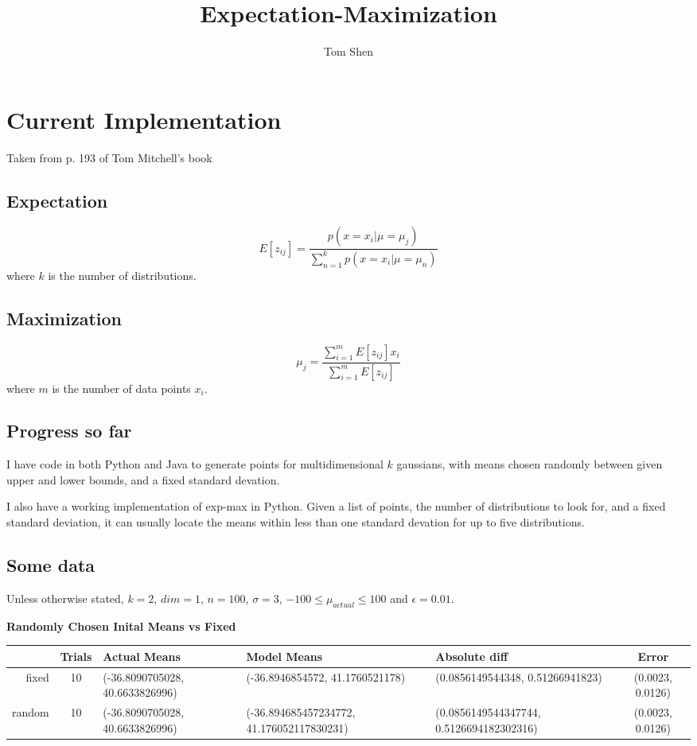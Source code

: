 \documentclass[12pt]{article} %
\title{Expectation-Maximization}
\author{Tom Shen}
\begin{document}
\maketitle

\section{Current Implementation}
Taken from p. 193 of Tom Mitchell's book
\subsection{Expectation}
$$E[z_{ij}] = \frac{p(x = x_i | \mu = \mu_j)}{\sum_{n=1}^k p(x = x_i | \mu = \mu_n)}$$
where $k$ is the number of distributions.

\subsection{Maximization}
$$\mu_j = \frac{\sum_{i=1}^mE[z_{ij}]x_i}{\sum_{i=1}^mE[z_{ij}]}$$
where $m$ is the number of data points $x_i$.

\subsection{Progress so far}
I have code in both Python and Java to generate points for multidimensional $k$ gaussians, with means chosen randomly between given upper and lower bounds, and a fixed standard devation.

I also have a working implementation of exp-max in Python. Given a list of points, the number of distributions to look for, and a fixed standard deviation, it can usually locate the means within less than one standard devation for up to five distributions.

\subsection{Some data}
Unless otherwise stated, $k=2$, $dim=1$, $n=100$, $\sigma = 3$, $-100 \leq \mu_{actual} \leq 100$ and $\epsilon = 0.01$.

\textbf{Randomly Chosen Inital Means vs Fixed}\\
\begin{tabular}{ r | c | p{3.2cm} | p{4.5cm}  | p{3.7cm}  | c }
 & Trials & Actual Means & Model Means & Absolute diff & Error \\
\hline
    
fixed & 10 & (-36.8090705028, 40.6633826996) & (-36.8946854572, 41.1760521178) & (0.0856149544348, 0.51266941823) & (0.0023, 0.0126) \\
\hline
random & 10 & (-36.8090705028, 40.6633826996) & (-36.894685457234772, 41.176052117830231) &  (0.0856149544347744, 0.5126694182302316) & (0.0023, 0.0126)\\
\end{tabular}
\end{document}
